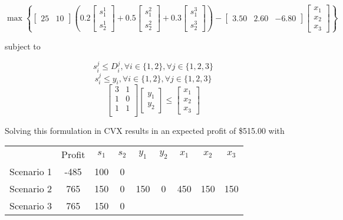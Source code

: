 \documentclass[a4paper]{article}
\begin{document}
\begin{equation}
\max \left \{ [\begin{matrix}25 & 10\end{matrix}]
\left( 0.2 \left [\begin{matrix}s_1^1 \\ s_2^1 \end{matrix} \right ] + 0.5 \left [\begin{matrix}s_1^2 \\ s_2^2 \end{matrix} \right ] + 0.3 \left [\begin{matrix}s_1^3 \\ s_2^3 \end{matrix} \right ] \right)
-[\begin{matrix}3.50 & 2.60 & -6.80\end{matrix}] \left [\begin{matrix}x_1 \\ x_2 \\ x_3 \end{matrix} \right ]
\right \}
\end{equation}

subject to

\begin{equation}
s_i^j \leq D_i^j , \forall i \in \{1,2\} , \forall j \in \{1,2,3\}
\end{equation}
\begin{equation}
s_i^j \leq y_i , \forall i \in \{1,2\} , \forall j \in \{1,2,3\}
\end{equation}
\begin{equation}
\left[
\begin{matrix}
3 & 1 \\
1 & 0 \\
1 & 1 \\
\end{matrix}
\right]
\left[\begin{matrix}y_1 \\ y_2\end{matrix}\right]
\leq
\left[\begin{matrix}x_1 \\ x_2 \\ x_3 \end{matrix}\right]
\end{equation}

Solving this formulation in CVX results in an expected profit of \$515.00 with

\begin{tabular}{c  c  c c  c c c c c}
           & Profit & $s_1$ & $s_2$ & $y_1$ & $y_2$ & $x_1$ & $x_2$ & $x_3$ \\
Scenario 1 & -485   & 100   & 0     &       &       &       &       &       \\
Scenario 2 &  765   & 150   & 0     & 150   & 0     & 450   & 150   & 150   \\
Scenario 3 &  765   & 150   & 0     &       &       &       &       &       \\
\end{tabular}
\end{document}
